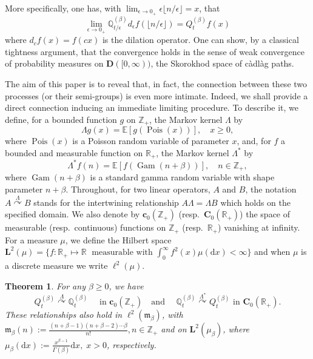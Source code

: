 \documentclass[10pt]{amsart}
\newtheorem{theo}{Theorem}[section]
\theoremstyle{definition}\newtheorem{defi}[theo]{Definition}\newtheorem{rema}[theo]{Remark}\newtheorem{exam}[theo]{Example}\newtheorem{exem}[theo]{Example}\newtheorem{nota}[theo]{Notation}
\DeclareMathOperator{\Pois}{Pois}
\DeclareMathOperator{\Gam}{Gam}
\newcommand{\df}{\mathrel{:=}}
\newcommand{\EE}{\mathbb{E}}
\newcommand{\RR}{\mathbb{R}}
\newcommand{\ZZ}{\mathbb{Z}}
\newcommand{\fm}{\mathfrak{m}}
\newcommand{\esL}{\mathbf{L}}
\newcommand{\esC}{\mathbf{C}}
\newcommand{\esc}{\mathbf{c}}
\newcommand*\E{{\mathbb E}}
\newcommand*\R{{\mathbb R}}
\newcommand{\discret}[1]{\mathds{#1}}
\newcommand{\cont}[1]{{#1}}
\newcommand{\adjL}{\Lambda^*}
\newcommand{\Gate}[3]{#1\stackrel{#2}{\curvearrowright}#3}
\newcommand*{\dd}{\mathrm{d}}
\newcommand*{\dx}{\dd x}
\begin{document}
More specifically, one has, with $\lim_{\epsilon \to 0_+} \epsilon{\lfloor n/\epsilon \rfloor}=x$, that
\[
\lim_{\epsilon\to 0_+}\discret{Q}_{t/\epsilon}^{(\beta)} \cont{d}_{\epsilon} f (\lfloor n/\epsilon \rfloor)= \cont{Q}^{(\beta)}_t f(x)
\]
where $\cont{d}_c f(x)=f(cx)$ is the dilation operator. One can show, by a classical tightness argument, that the convergence holds in the sense of weak convergence of probability measures on $\mathbf{D}([0,\infty))$, the Skorokhod space of c\`adl\`ag paths.

The aim of this paper is to reveal that, in fact, the connection between these two processes (or their semi-groups) is even more intimate. Indeed, we shall provide a direct connection inducing an immediate limiting procedure. To describe it, we define, for a bounded function $g$ on $\ZZ_+$, the Markov kernel $\Lambda$ by
\begin{equation}\label{eq:Lambda-def}
\Lambda g (x) = \E\left[g(\Pois(x))\right], \quad x\geq 0,
\end{equation}
where $\Pois(x)$ is a Poisson random variable of parameter $x$, and, for $f$ a bounded and measurable function on $\RR_+$, the Markov kernel $\adjL$ by
\begin{equation}\label{eq:tild-Lambda-def}
\adjL f(n)=\EE[f(\Gam(n+\beta))],\quad n\in \ZZ_+,
\end{equation}
where $\Gam(n+\beta)$ is a standard gamma random variable with shape parameter $n+\beta$. Throughout, for two linear operators, $A$ and $B$, the notation $\Gate{A}{\Lambda}{B}$ stands for the intertwining relationship $A\Lambda=\Lambda B$ which holds on the specified domain. We also denote by $\esc_0(\ZZ_+)$ (resp.~$\esC_0(\RR_+)$) the space of measurable (resp.~continuous) functions on $\ZZ_+$ (resp.~$\RR_+$) vanishing at infinity. For a measure $\mu$, we define the Hilbert space $\esL^2(\mu)=\{f :\RR_+\mapsto \R \; \text{ measurable with } \int_{0}^{\infty}f^2(x) \mu(\dx)<\infty\}$ and when $\mu$ is a discrete measure we write $\ell^2(\mu)$.


\begin{theo}\label{thm:main}
\label{semig}
For any $\beta\geq 0$, we have
\begin{equation}
\Gate{\cont{Q}_t^{(\beta)}}{\Lambda}{\discret{Q}_t^{(\beta)}} \quad \text{ in $\esc_0(\ZZ_+)$ }
\text{ and } \quad
\Gate{\discret{Q}_t^{(\beta)}}{\adjL}{\cont{Q}_t^{(\beta)}} \text{ in $\esC_0(\RR_+)$}.\label{eq:gatewayLag}
\end{equation}
These relationships also hold in $ \ell^2({\fm_{\beta}})$, with $\fm_{\beta}(n)\df \frac{(n+\beta-1)(n+\beta-2)\cdots \beta}{n!}, n\in \ZZ_+$ and on $\esL^2(\mu_{\beta})$, where $\mu_{\beta}(\dx)\df \frac{x^{\beta-1}}{\Gamma(\beta)}\dx, \; x>0$, respectively.
\end{theo}
\end{document}
